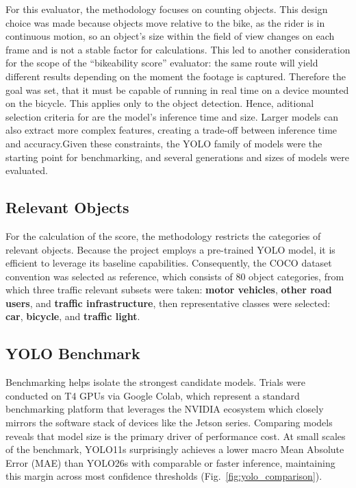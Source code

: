 \documentclass[letterpaper,journal]{IEEEtran}
\begin{document}
For this evaluator, the methodology focuses on counting objects.
This design choice was made because objects move relative to the bike, as the 
rider is in continuous motion, so an object's size within the field of view 
changes on each frame and is not a stable factor for calculations. 
This led to another consideration for the scope of the 
\enquote{bikeability score} evaluator: the same route will yield 
different results depending on the moment the footage is captured.
Therefore the goal was set, that it must be capable of running 
in real time on a device mounted on the bicycle.
This applies only to the object detection. Hence, 
aditional selection criteria for are the model's inference time and size. 
Larger models can also extract more complex features, 
creating a trade-off between inference time and accuracy.Given these constraints, 
the YOLO family of models were the starting point for 
benchmarking, and several generations and sizes of models were evaluated.

\subsection{Relevant Objects}
For the calculation of the score, the methodology restricts the
categories of relevant objects. Because the project employs a pre-trained YOLO model, it is  
efficient to leverage its baseline capabilities. Consequently, the COCO \cite{coco} dataset 
convention was selected as reference, which consists of 80 object categories, from which three traffic relevant 
subsets were taken: \textbf{motor vehicles}, \textbf{other road users}, and 
\textbf{traffic infrastructure}, then representative classes were selected: \textbf{car},
\textbf{bicycle}, and \textbf{traffic light}.

\subsection{YOLO Benchmark}
Benchmarking helps isolate the strongest candidate models.
Trials were conducted on T4 GPUs via Google Colab, which
represent a standard benchmarking platform \cite{yolo26} that 
leverages the NVIDIA ecosystem which closely mirrors the software stack of 
devices like the Jetson series.
Comparing models reveals that model size is the primary driver of performance cost.
At small scales of the benchmark, YOLO11s surprisingly achieves a lower 
macro Mean Absolute Error (MAE) than YOLO26s with comparable or faster inference,
maintaining this margin across most confidence thresholds
(Fig.~\ref{fig:yolo_comparison}).
\end{document}
